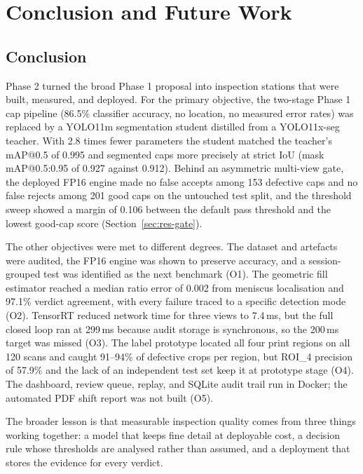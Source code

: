 \chapter{Conclusion and Future Work}
\label{ch:concl}

\section{Conclusion}
\label{sec:conclusion}

Phase 2 turned the broad Phase 1 proposal into inspection stations that were built, measured, and deployed. For the primary objective, the two-stage Phase 1 cap pipeline (86.5\% classifier accuracy, no location, no measured error rates) was replaced by a YOLO11m segmentation student distilled from a YOLO11x-seg teacher. With 2.8 times fewer parameters the student matched the teacher's mAP@0.5 of 0.995 and segmented caps more precisely at strict IoU (mask mAP@0.5:0.95 of 0.927 against 0.912). Behind an asymmetric multi-view gate, the deployed FP16 engine made no false accepts among 153 defective caps and no false rejects among 201 good caps on the untouched test split, and the threshold sweep showed a margin of 0.106 between the default pass threshold and the lowest good-cap score (Section~\ref{sec:res-gate}).

The other objectives were met to different degrees. The dataset and artefacts were audited, the FP16 engine was shown to preserve accuracy, and a session-grouped test was identified as the next benchmark (O1). The geometric fill estimator reached a median ratio error of 0.002 from meniscus localisation and 97.1\% verdict agreement, with every failure traced to a specific detection mode (O2). TensorRT reduced network time for three views to 7.4\,ms, but the full closed loop ran at 299\,ms because audit storage is synchronous, so the 200\,ms target was missed (O3). The label prototype located all four print regions on all 120 scans and caught 91--94\% of defective crops per region, but ROI\_4 precision of 57.9\% and the lack of an independent test set keep it at prototype stage (O4). The dashboard, review queue, replay, and SQLite audit trail run in Docker; the automated PDF shift report was not built (O5).

The broader lesson is that measurable inspection quality comes from three things working together: a model that keeps fine detail at deployable cost, a decision rule whose thresholds are analysed rather than assumed, and a deployment that stores the evidence for every verdict.

